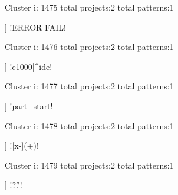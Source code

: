 Cluster i: 1475
total projects:2
total patterns:1
\begin{multicols}{1}
\begin{description}[noitemsep,topsep=0pt]
\item [[2] ] \cverb!ERROR FAIL!
\end{description}
\end{multicols}







Cluster i: 1476
total projects:2
total patterns:1
\begin{multicols}{1}
\begin{description}[noitemsep,topsep=0pt]
\item [[2] ] \cverb!e1000|^ide!
\end{description}
\end{multicols}







Cluster i: 1477
total projects:2
total patterns:1
\begin{multicols}{1}
\begin{description}[noitemsep,topsep=0pt]
\item [[2] ] \cverb!part_start!
\end{description}
\end{multicols}







Cluster i: 1478
total projects:2
total patterns:1
\begin{multicols}{1}
\begin{description}[noitemsep,topsep=0pt]
\item [[2] ] \cverb![x-](\d+)!
\end{description}
\end{multicols}







Cluster i: 1479
total projects:2
total patterns:1
\begin{multicols}{1}
\begin{description}[noitemsep,topsep=0pt]
\item [[2] ] \cverb!\r?\n\r?\n!
\end{description}
\end{multicols}







